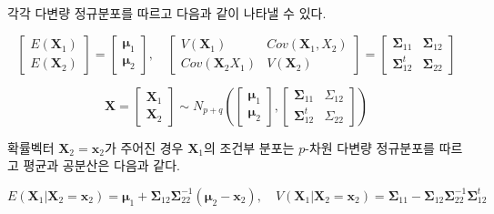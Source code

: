\documentclass[
]{book}
\theoremstyle{definition}
\theoremstyle{definition}
\theoremstyle{definition}
\theoremstyle{remark}
\begin{document}
각각 다변량 정규분포를 따르고 다음과 같이 나타낼 수 있다.

\[ 
  \begin{bmatrix}
  E(\bm X_1) \\
  E(\bm X_2)
  \end{bmatrix}
  =
    \begin{bmatrix}
  \bm \mu_1 \\
  \bm \mu_2
  \end{bmatrix}
  , \quad 
  \begin{bmatrix}
  V(\bm X_1) & Cov(\bm X_1, X_2) \\
  Cov(\bm X_2 X_1) & V(\bm X_2)
  \end{bmatrix}
  =
    \begin{bmatrix}
  \bm \Sigma_{11} & \bm \Sigma_{12} \\
  \bm \Sigma^t_{12} & \bm \Sigma_{22}
  \end{bmatrix}
  \]

\[  \bm X =
    \begin{bmatrix}
  \bm X_1 \\
  \bm X_2
  \end{bmatrix}
  \sim
  N_{p+q} \left (
    \begin{bmatrix}
    \bm \mu_1 \\
    \bm \mu_2
    \end{bmatrix}
    ,\begin{bmatrix}
    \bm \Sigma_{11} & \Sigma_{12} \\
    \bm \Sigma^t_{12} & \Sigma_{22}
    \end{bmatrix}
    \right )
  \]

확률벡터 \(\bm X_2 = \bm x_2\)가 주어진 경우 \(\bm X_1\)의 조건부 분포는 \(p\)-차원 다변량 정규분포를 따르고 평균과 공분산은 다음과 같다.

\[ 
  E(\bm X_1 | \bm X_2 = \bm x_2 ) = \bm \mu_1 + \bm \Sigma_{12} \bm \Sigma^{-1}_{22} (\bm \mu_2 - \bm x_2), \quad
  V(\bm X_1 | \bm X_2 = \bm x_2 )  = \bm \Sigma_{11} -\bm \Sigma_{12} \bm \Sigma^{-1}_{22} \bm \Sigma^t_{12}
  \]
\end{document}

